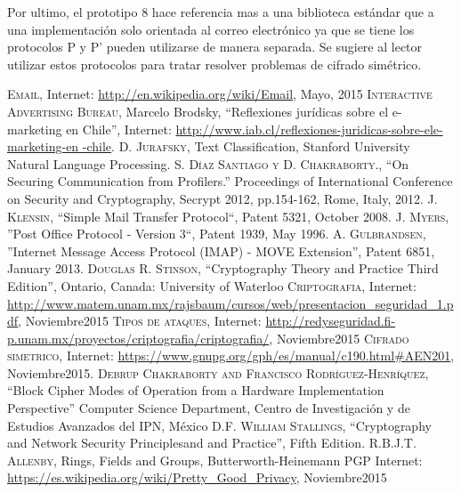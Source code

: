 \documentclass[12pt,oneside,onecolumn,openany]{report}
\begin{document}
Por ultimo, el prototipo 8 hace referencia mas a una biblioteca estándar que a una implementación solo orientada al correo electrónico ya que se tiene los protocolos P y P’ pueden utilizarse de manera separada. Se sugiere al lector utilizar estos protocolos para tratar resolver problemas de cifrado simétrico.


\begin{thebibliography}{a}
   \textsc{Email}, Internet: \url{http://en.wikipedia.org/wiki/Email}, Mayo, 2015
   \textsc{Interactive Advertising Bureau}, Marcelo Brodsky, “Reflexiones jurídicas sobre el e-marketing en Chile”, Internet: \url{http://www.iab.cl/reflexiones-juridicas-sobre-ele-marketing-en -chile}.
   \textsc{D. Jurafsky}, Text Classification, Stanford University Natural Language Processing.
   \textsc{S. Díaz Santiago y D. Chakraborty.}, ``On Securing Communication from Profilers.” Proceedings of International Conference on Security and Cryptography, Secrypt 2012, pp.154-162, Rome, Italy, 2012.
   \textsc{J. Klensin}, ``Simple Mail Transfer Protocol``, Patent 5321, October 2008. 
   \textsc{J. Myers}, ''Post Office Protocol - Version 3``, Patent 1939, May 1996. 
   \textsc{A.  Gulbrandsen}, ''Internet  Message  Access  Protocol  (IMAP)  -  MOVE  Extension'',  Patent 6851, January 2013. 
   \textsc{Douglas R. Stinson}, ``Cryptography Theory and Practice Third Edition'', Ontario, Canada: University of Waterloo
   \textsc{Criptografia}, Internet: \url{http://www.matem.unam.mx/rajsbaum/cursos/web/presentacion_seguridad_1.pdf}, Noviembre2015
   \textsc{Tipos de ataques}, Internet: \url{http://redyseguridad.fi-p.unam.mx/proyectos/criptografia/criptografia/}, Noviembre2015
   \textsc{Cifrado simetrico}, Internet: \url{https://www.gnupg.org/gph/es/manual/c190.html#AEN201}, Noviembre2015.
   \textsc{Debrup Chakraborty and Francisco Rodríguez-Henríquez}, ``Block Cipher Modes of Operation from a Hardware Implementation Perspective'' Computer Science Department, Centro de Investigación y de Estudios Avanzados del IPN, México D.F. 
   \textsc{William Stallings}, ``Cryptography and Network Security Principlesand and Practice'', Fifth Edition.
   \textsc{R.B.J.T. Allenby}, Rings, Fields and Groups, Butterworth-Heinemann
   \textsc{PGP} Internet: \url{https://es.wikipedia.org/wiki/Pretty_Good_Privacy}, Noviembre2015

\end{thebibliography}
\end{document}
